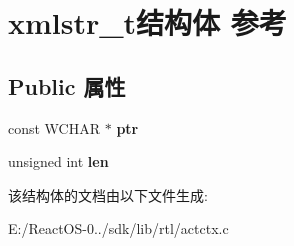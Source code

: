 \hypertarget{structxmlstr__t}{}\section{xmlstr\+\_\+t结构体 参考}
\label{structxmlstr__t}
\subsection*{Public 属性}
\begin{DoxyCompactItemize}
\item 
\mbox{\label{structxmlstr__t_a330c4d9c64c2b06b75ef238837b4e6e5}} 
const W\+C\+H\+AR $\ast$ {\bfseries ptr}
\item 
\mbox{\label{structxmlstr__t_a89c9152d229dce3f31453054662ecc56}} 
unsigned int {\bfseries len}
\end{DoxyCompactItemize}


该结构体的文档由以下文件生成\+:\begin{DoxyCompactItemize}
\item 
E\+:/\+React\+O\+S-\/0../sdk/lib/rtl/actctx.\+c\end{DoxyCompactItemize}
